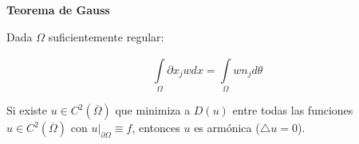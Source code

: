 \documentclass[openany]{book}
\begin{document}



\begin{theorem}
    \textbf{Teorema de Gauss}

    Dada $ \Omega  $ suficientemente regular:

    $$ \int\limits_{\Omega }^{} \partial x_j wdx = \int\limits_{\Omega }^{} w n_j d \theta $$
\end{theorem}

\begin{proposition}
    Si existe $ u \in C^2(\overline{\Omega}) $ que minimiza a $ D(u) $ entre todas las funciones $ u \in C^2(\overline{\Omega})   $ con $ u|_{\partial\Omega} \equiv f $, entonces $ u $ es armónica ($ \triangle u = 0 $).

\end{proposition}
\end{document}
